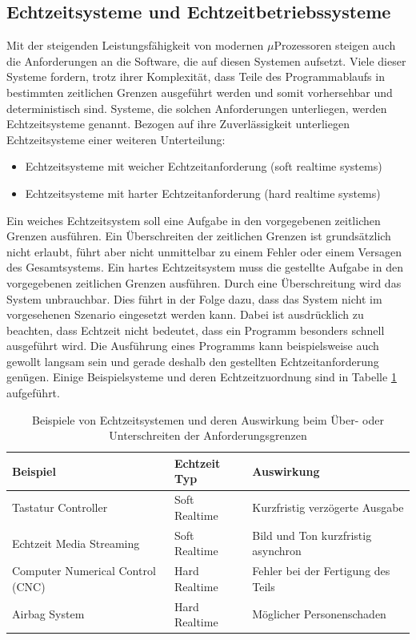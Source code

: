 \subsection{Echtzeitsysteme und Echtzeitbetriebssysteme}
\label{sec:Echtzeitsysteme}
Mit der steigenden Leis\-tungs\-fähig\-keit von modernen $\mu$Pro\-zesso\-ren steigen auch die Anforderungen an die Software, die auf diesen Systemen aufsetzt. Viele dieser Systeme fordern, trotz ihrer Komplexität, dass Teile des Pro\-gramm\-ab\-laufs in bestimmten zeitlichen Grenzen aus\-ge\-führt werden und somit vorhersehbar und deterministisch\cite{9780128015070} sind.
Systeme, die solchen Anforderungen unterliegen, werden Echtzeitsysteme genannt. Bezogen auf ihre Zuverlässigkeit unterliegen Echtzeitsysteme einer weiteren Unterteilung:
\begin{itemize}
	\item Echtzeitsysteme mit weicher Echtzeitanforderung (soft realtime systems)
	\item Echtzeitsysteme mit harter Echtzeitanforderung (hard realtime systems)
\end{itemize}
   Ein weiches Echtzeitsystem soll eine Aufgabe in den vorgegebenen zeitlichen Grenzen ausführen. Ein Über\-schrei\-ten der zeitlichen Grenzen ist grundsätzlich nicht erlaubt, führt aber nicht unmittelbar zu einem Fehler oder einem Versagen des Gesamtsystems. Ein hartes Echtzeitsystem muss die gestellte Aufgabe in den vorgegebenen zeitlichen Grenzen aus\-füh\-ren. Durch eine Über\-schrei\-tung wird das System unbrauchbar. Dies führt in der Folge dazu, dass das System nicht im vorgesehenen Szenario eingesetzt werden kann. Dabei ist ausdrücklich zu beachten, dass Echtzeit nicht bedeutet, dass ein Programm besonders schnell ausgeführt wird. Die Ausführung eines Programms kann beispielsweise auch gewollt langsam sein und gerade deshalb den gestellten Echtzeitanforderung genügen. Einige Beispielsysteme und deren Echtzeitzuordnung sind in Tabelle \ref{tab:BeispieleEchtzeitsystem} aufgeführt. 
\begin{table}
\centering
	\begin{tabular}{|l|l|l|}
		\hline
		\textbf{Beispiel} & \textbf{Echtzeit Typ}  & \textbf{Auswirkung} \\
		\hline
		Tastatur Controller & Soft Realtime & Kurzfristig verzögerte Ausgabe \\
		\hline
		Echtzeit Media Streaming  & Soft Realtime & Bild und Ton kurzfristig asynchron \\
		\hline
		Computer Numerical Control (CNC)  & Hard Realtime & Fehler bei der Fertigung des Teils\\
		\hline
		Airbag System  & Hard Realtime & Möglicher Personenschaden\\
		\hline
	\end{tabular}
	\caption{Beispiele von Echtzeitsystemen und deren Auswirkung beim Über- oder Unterschreiten der Anforderungsgrenzen}
	\label{tab:BeispieleEchtzeitsystem}
\end{table}

